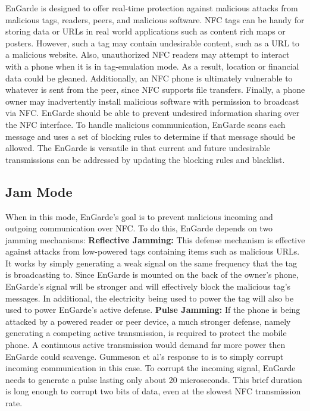 \documentclass{sig-alternate}
\begin{document}
EnGarde is designed to offer real-time protection against malicious attacks from malicious tags, readers, peers, and malicious software. NFC tags can be handy for storing data or URLs in real world applications such as content rich maps or posters. However, such a tag may contain undesirable content, such as a URL to a malicious website. Also, unauthorized NFC readers may attempt to interact with a phone when it is in tag-emulation mode. As a result, location or financial data could be gleaned. Additionally, an NFC phone is ultimately vulnerable to whatever is sent from the peer, since NFC supports file transfers. Finally, a phone owner may inadvertently install malicious software with permission to broadcast via NFC. EnGarde should be able to prevent undesired information sharing over the NFC interface.
\vspace{2mm}\newline
To handle malicious communication, EnGarde scans each message and uses a set of blocking rules to determine if that message should be allowed. The EnGarde is versatile in that current and future undesirable transmissions can be addressed by updating the blocking rules and blacklist.

\subsection{Jam Mode}
When in this mode, EnGarde's goal is to prevent malicious incoming and outgoing communication over NFC. To do this, EnGarde depends on two jamming mechanisms:
\vspace{2mm}\newline
\noindent\textbf{Reflective Jamming:} This defense mechanism is effective against attacks from low-powered tags containing items such as malicious URLs. It works by simply generating a weak signal on the same frequency that the tag is broadcasting to. Since EnGarde is mounted on the back of the owner's phone, EnGarde's signal will be stronger and will effectively block the malicious tag's messages. In additional, the electricity being used to power the tag will also be used to power EnGarde's active defense.
\vspace{2mm}\newline
\noindent\textbf{Pulse Jamming:} If the phone is being attacked by a powered reader or peer device, a much stronger defense, namely generating a competing active transmission, is required to protect the mobile phone. A continuous active transmission would demand far more power then EnGarde could scavenge. Gummeson et al's response to is to simply corrupt incoming communication in this case. To corrupt the incoming signal, EnGarde needs to generate a pulse lasting only about 20 microseconds. This brief duration is long enough to corrupt two bits of data, even at the slowest NFC transmission rate.
\end{document}
